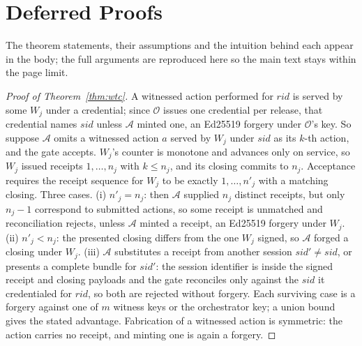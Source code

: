 \documentclass[letterpaper,10pt,twocolumn]{article}
\theoremstyle{definition}
\begin{document}
\section{Deferred Proofs}\label{sec:appendix_proofs}
The theorem statements, their assumptions and the intuition behind each
appear in the body; the full arguments are reproduced here so the main
text stays within the page limit.

\begin{proof}[Proof of Theorem~\ref{thm:wtc}]
A witnessed action performed for $\mathit{rid}$ is served by some $W_j$ under a credential; since $\mathcal{O}$ issues one credential per release, that credential names $\mathit{sid}$ unless $\mathcal{A}$ minted one, an Ed25519 forgery under $\mathcal{O}$'s key. So suppose $\mathcal{A}$ omits a witnessed action $a$ served by $W_j$ under $\mathit{sid}$ as its $k$-th action, and the gate accepts. $W_j$'s counter is monotone and advances only on service, so $W_j$ issued receipts $1,\dots,n_j$ with $k \le n_j$, and its closing commits to $n_j$. Acceptance requires the receipt sequence for $W_j$ to be exactly $1,\dots,n'_j$ with a matching closing. Three cases. (i) $n'_j = n_j$: then $\mathcal{A}$ supplied $n_j$ distinct receipts, but only $n_j - 1$ correspond to submitted actions, so some receipt is unmatched and reconciliation rejects, unless $\mathcal{A}$ minted a receipt, an Ed25519 forgery under $W_j$. (ii) $n'_j < n_j$: the presented closing differs from the one $W_j$ signed, so $\mathcal{A}$ forged a closing under $W_j$. (iii) $\mathcal{A}$ substitutes a receipt from another session $\mathit{sid}' \neq \mathit{sid}$, or presents a complete bundle for $\mathit{sid}'$: the session identifier is inside the signed receipt and closing payloads and the gate reconciles only against the $\mathit{sid}$ it credentialed for $\mathit{rid}$, so both are rejected without forgery. Each surviving case is a forgery against one of $m$ witness keys or the orchestrator key; a union bound gives the stated advantage. Fabrication of a witnessed action is symmetric: the action carries no receipt, and minting one is again a forgery.
\end{proof}
\end{document}
